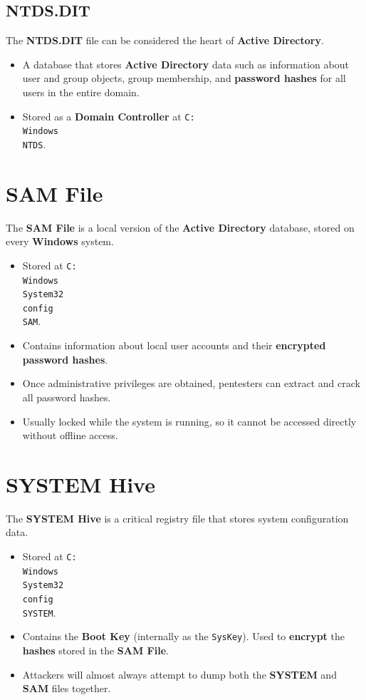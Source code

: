 \documentclass[12pt, letterpaper]{article}
\begin{document}
\subsection*{NTDS.DIT}

The \textbf{NTDS.DIT} file can be considered the heart of \textbf{Active Directory}.

\begin{itemize}
    \item A database that stores \textbf{Active Directory} data such as information about user and group objects, group membership, and \textbf{password hashes} for all users in the entire domain.
    \item Stored as a \textbf{Domain Controller} at \texttt{C:\\Windows\\NTDS}.
\end{itemize}

\section*{SAM File}

The \textbf{SAM File} is a local version of the \textbf{Active Directory} database, stored on every \textbf{Windows} system.

\begin{itemize}
    \item Stored at \texttt{C:\\Windows\\System32\\config\\SAM}.
    \item Contains information about local user accounts and their \textbf{encrypted password hashes}.
    \item Once administrative privileges are obtained, pentesters can extract and crack all password hashes.
    \item Usually locked while the system is running, so it cannot be accessed directly without offline access.
\end{itemize}

\section*{SYSTEM Hive}

The \textbf{SYSTEM Hive} is a critical registry file that stores system configuration data.

\begin{itemize}
    \item Stored at \texttt{C:\\Windows\\System32\\config\\SYSTEM}.
    \item Contains the \textbf{Boot Key} (internally as the \texttt{SysKey}). Used to \textbf{encrypt} the \textbf{hashes} stored in the \textbf{SAM File}.
    \item Attackers will almost always attempt to dump both the \textbf{SYSTEM} and \textbf{SAM} files together.
\end{itemize}
\end{document}
